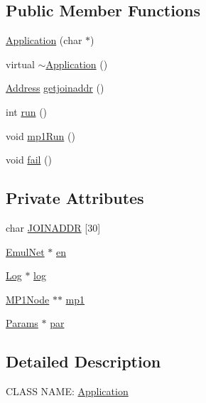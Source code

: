 \subsection*{\-Public \-Member \-Functions}
\begin{DoxyCompactItemize}
\item 
\hyperlink{class_application_a780412190c529b3445ea73912b9c3a32}{\-Application} (char $\ast$)
\item 
virtual \hyperlink{class_application_a748bca84fefb9c12661cfaa2f623748d}{$\sim$\-Application} ()
\item 
\hyperlink{class_address}{\-Address} \hyperlink{class_application_ac01a037d21d4d7e9f4f9ba1836709846}{getjoinaddr} ()
\item 
int \hyperlink{class_application_a8cf8941c8db90117d3735bce5ae1fdf4}{run} ()
\item 
void \hyperlink{class_application_a4ee14b17094145f2b3c174500932adc8}{mp1\-Run} ()
\item 
void \hyperlink{class_application_a867c9c2a20e754ab3b1de41cff822157}{fail} ()
\end{DoxyCompactItemize}
\subsection*{\-Private \-Attributes}
\begin{DoxyCompactItemize}
\item 
char \hyperlink{class_application_acca96da4be60c3bc3018337cc6233e46}{\-J\-O\-I\-N\-A\-D\-D\-R} \mbox{[}30\mbox{]}
\item 
\hyperlink{class_emul_net}{\-Emul\-Net} $\ast$ \hyperlink{class_application_a96273af089eddb43c743f6386ca3938c}{en}
\item 
\hyperlink{class_log}{\-Log} $\ast$ \hyperlink{class_application_a92d6f9eb17704ca7a7d28862faa4cbd0}{log}
\item 
\hyperlink{class_m_p1_node}{\-M\-P1\-Node} $\ast$$\ast$ \hyperlink{class_application_a858c988b6be86ab4d6d41b044d15ef1a}{mp1}
\item 
\hyperlink{class_params}{\-Params} $\ast$ \hyperlink{class_application_aca640b0742d1f5325a031584a9224a00}{par}
\end{DoxyCompactItemize}


\subsection{\-Detailed \-Description}
\-C\-L\-A\-S\-S \-N\-A\-M\-E\-: \hyperlink{class_application}{\-Application}

